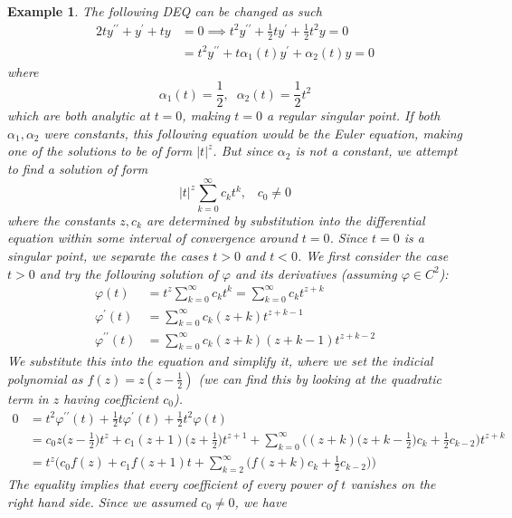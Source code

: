 \documentclass{article}
\newtheorem{example}{Example}[section]
\theoremstyle{remark}
\theoremstyle{definition}
\begin{document}
      \begin{example}
      The following DEQ can be changed as such
      \begin{align*}
          2ty^{\prime\prime} + y^\prime + ty & = 0 \implies t^2 y^{\prime\prime} + \frac{1}{2} ty^\prime + \frac{1}{2} t^2 y = 0 \\
          & = t^2 y^{\prime\prime} + t \alpha_1 (t) y^\prime + \alpha_2 (t) y = 0
      \end{align*}
      where
      \[\alpha_1 (t) = \frac{1}{2}, \;\; \alpha_2 (t) = \frac{1}{2} t^2\]
      which are both analytic at $t = 0$, making $t = 0$ a regular singular point. If both $\alpha_1, \alpha_2$ were constants, this following equation would be the Euler equation, making one of the solutions to be of form $|t|^z$. But since $\alpha_2$ is not a constant, we attempt to find a solution of form 
      \[|t|^z \sum_{k=0}^\infty c_k t^k, \;\;\; c_0 \neq 0\]
      where the constants $z, c_k$ are determined by substitution into the differential equation within some interval of convergence around $t = 0$. Since $t = 0$ is a singular point, we separate the cases $t>0$ and $t<0$. We first consider the case $t>0$ and try the following solution of $\varphi$ and its derivatives (assuming $\varphi \in C^2$): 
      \begin{align*}
          \varphi (t) & = t^z \sum_{k=0}^\infty c_k t^k = \sum_{k=0}^\infty c_k t^{z+k} \\
          \varphi^\prime (t) & = \sum_{k=0}^\infty c_k (z+k) t^{z+k-1} \\
          \varphi^{\prime\prime} (t) & = \sum_{k=0}^\infty c_k (z+k)(z+k-1) t^{z+k-2} 
      \end{align*}
      We substitute this into the equation and simplify it, where we set the indicial polynomial as $f(z) = z (z - \frac{1}{2})$ (we can find this by looking at the quadratic term in $z$ having coefficient $c_0$). 
      \begin{align*}
          0 & = t^2 \varphi^{\prime\prime} (t) + \frac{1}{2} t \varphi^\prime (t) + \frac{1}{2} t^2 \varphi (t) \\
          & = c_0 z \bigg(z - \frac{1}{2}\bigg) t^z + c_1 (z+1) \bigg( z+\frac{1}{2}\bigg) t^{z+1} + \sum_{k=0}^\infty \bigg( (z+k) \Big(z+k-\frac{1}{2} \Big) c_k + \frac{1}{2} c_{k-2}\bigg) t^{z+k}\\
          & = t^z \Bigg( c_0 f(z) + c_1 f(z+1) t + \sum_{k=2}^\infty \bigg( f(z+k) c_k + \frac{1}{2} c_{k-2} \bigg)\Bigg) 
      \end{align*}
      The equality implies that every coefficient of every power of $t$ vanishes on the right hand side. Since we assumed $c_0 \neq 0$, we have

\end{example}
\end{document}
